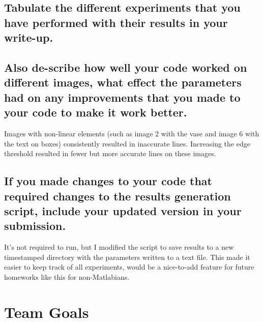 \documentclass[12pt]{article}
\begin{document}
\subsection{Tabulate the different experiments that you have performed with their results in your write-up.}

\subsection{Also de-scribe how well your code worked on different images, what effect the parameters had on any improvements that you made to your code to make it work better. }
Images with non-linear elements (such as image 2 with the vase and image 6 with the text on boxes) consistently resulted in inaccurate lines. Increasing the edge threshold resulted in fewer but more accurate lines on these images.

\subsection{If you made changes to your code that required changes to the results generation script, include your updated version in your submission.  }
It's not required to run, but I modified the script to save results to a new timestamped directory with the parameters written to a text file. This made it easier to keep track of all experiments, would be a nice-to-add feature for future homeworks like this for non-Matlabians.

\newpage


\section{Team Goals}
\end{document}
